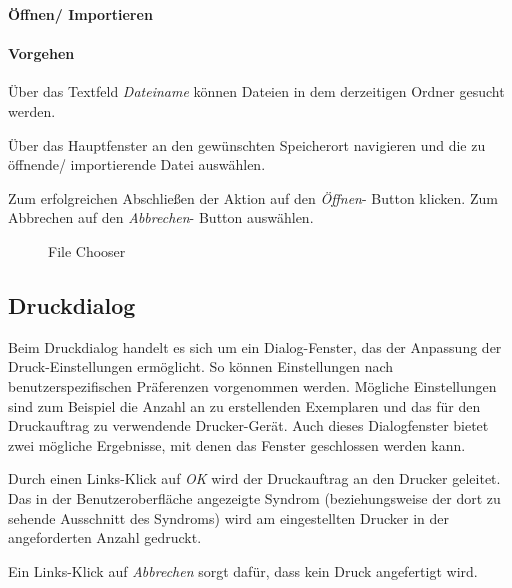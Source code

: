 \documentclass[enabledeprecatedfontcommands,fontsize=11pt,paper=a4,twoside]{scrartcl}
\newcounter{one}
\newcounter{two}[one]
\newcommand*{\action}{\paragraph{Vorgehen}}
\let\tempone\itemize
\let\temptwo\enditemize
\renewenvironment{itemize}{\tempone\addtolength{\itemsep}{-10.0pt}}{\temptwo}
\let\origenumerate\enumerate
\let\origendenumerate\endenumerate
\renewenvironment{enumerate}{\origenumerate \addtolength{\itemsep}{-10.0pt}}{\origendenumerate}
\begin{document}
\textbf{Öffnen/ Importieren}
\action
\begin{enumerate}
	\item Über das Textfeld \textit{Dateiname} können Dateien in dem derzeitigen Ordner gesucht werden.
	\item Über das Hauptfenster an den gewünschten Speicherort navigieren und die zu öffnende/ importierende Datei auswählen.
	\item Zum erfolgreichen Abschließen der Aktion auf den \textit{Öffnen}- Button klicken. Zum Abbrechen auf den \textit{Abbrechen}- Button auswählen.
\end{enumerate}

 \begin{figure}[ht!]
 	\centering
 	\caption{File Chooser}	
 \end{figure}

\newpage
\subsection{Druckdialog}
Beim Druckdialog handelt es sich um ein Dialog-Fenster, das der Anpassung der Druck-Einstellungen ermöglicht. So können Einstellungen nach benutzerspezifischen Präferenzen vorgenommen werden. Mögliche Einstellungen sind zum Beispiel die Anzahl an zu erstellenden Exemplaren und das für den Druckauftrag zu verwendende Drucker-Gerät.
Auch dieses Dialogfenster bietet zwei mögliche Ergebnisse, mit denen das Fenster geschlossen werden kann.
\begin{itemize}
	\item Durch einen Links-Klick auf \textit{OK} wird der Druckauftrag an den Drucker geleitet. Das in der Benutzeroberfläche angezeigte Syndrom (beziehungsweise der dort zu sehende Ausschnitt des Syndroms) wird am eingestellten Drucker in der angeforderten Anzahl gedruckt. 
	\item Ein Links-Klick auf \textit{Abbrechen} sorgt dafür, dass kein Druck angefertigt wird.
\end{itemize}
\end{document}
